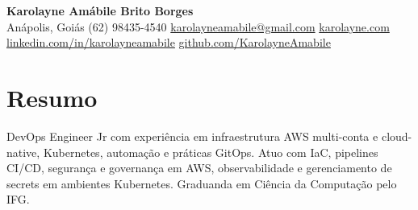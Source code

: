\documentclass[a4paper,10pt]{article}
\begin{document}
\begin{center}
    {\LARGE \textbf{Karolayne Amábile Brito Borges}} 
    \\ [0.1cm]
    Anápolis, Goiás
    {\textbullet}
    (62) 98435-4540
    {\textbullet}
    \href{mailto:karolayneamabile@gmail.com}{karolayneamabile@gmail.com} 
    {\textbullet}
    \href{https://karolayne.com}{karolayne.com}
    \\
    \href{https://linkedin.com/in/karolayneamabile}{linkedin.com/in/karolayneamabile}
    {\textbullet}
    \href{https://github.com/KarolayneAmabile}{github.com/KarolayneAmabile}
\end{center}


\section{Resumo}

DevOps Engineer Jr com experiência em infraestrutura AWS multi-conta e cloud-native,
Kubernetes, automação e práticas GitOps. Atuo com IaC, pipelines CI/CD, segurança e
governança em AWS, observabilidade e gerenciamento de secrets em ambientes Kubernetes.
Graduanda em Ciência da Computação pelo IFG.

\end{document}
